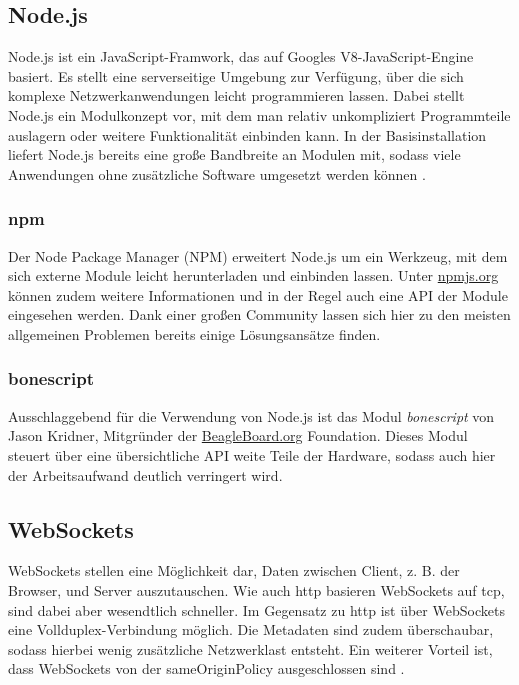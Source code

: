 \documentclass[thesis.tex]{subfiles}
\begin{document}
\subsection{Node.js}
\label{subsec:Node.js}
Node.js ist ein JavaScript-Framwork, das auf Googles V8-JavaScript-Engine basiert. Es stellt eine serverseitige Umgebung zur Verfügung, über die sich komplexe Netzwerkanwendungen leicht programmieren lassen. Dabei stellt Node.js ein Modulkonzept vor, mit dem man relativ unkompliziert Programmteile auslagern oder weitere Funktionalität einbinden kann. In der Basisinstallation liefert Node.js bereits eine große Bandbreite an Modulen mit, sodass viele Anwendungen ohne zusätzliche Software umgesetzt werden können \cite{springer2013}.

\subsubsection{npm}
Der Node Package Manager (NPM) erweitert Node.js um ein Werkzeug, mit dem sich externe Module leicht herunterladen und einbinden lassen. Unter \href{https://www.npmjs.org/}{npmjs.org} können zudem weitere Informationen und in der Regel auch eine API der Module eingesehen werden. Dank einer großen Community lassen sich hier zu den meisten allgemeinen Problemen bereits einige Lösungsansätze finden.

\subsubsection{bonescript}
Ausschlaggebend für die Verwendung von Node.js ist das Modul \textit{bonescript} von Jason Kridner, Mitgründer der \href{http://beagleboard.org/}{BeagleBoard.org} Foundation. Dieses Modul steuert über eine übersichtliche API weite Teile der Hardware, sodass auch hier der Arbeitsaufwand deutlich verringert wird.

\subsection{WebSockets}
WebSockets stellen eine Möglichkeit dar, Daten zwischen Client, z. B. der Browser, und Server auszutauschen. Wie auch \gls{http} basieren WebSockets auf \gls{tcp}, sind dabei aber wesendtlich schneller. Im Gegensatz zu \gls{http} ist über WebSockets eine Vollduplex-Verbindung möglich. Die Metadaten sind zudem überschaubar, sodass hierbei wenig zusätzliche Netzwerklast entsteht. Ein weiterer Vorteil ist, dass WebSockets von der \gls{sameOriginPolicy} ausgeschlossen sind \cite{rfc6455}.
\end{document}
